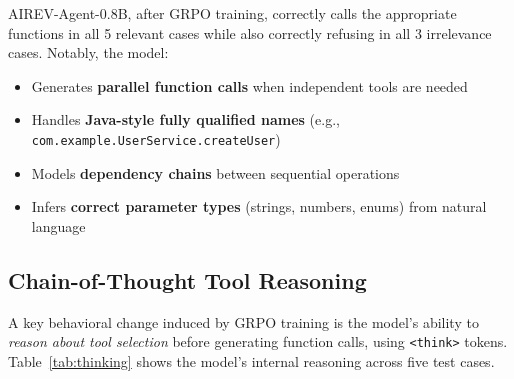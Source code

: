 \documentclass[10pt,twocolumn]{article}
\begin{document}
AIREV-Agent-0.8B, after GRPO training, correctly calls the appropriate functions in all 5 relevant cases while also correctly refusing in all 3 irrelevance cases. Notably, the model:

\begin{itemize}[itemsep=1pt]
    \item Generates \textbf{parallel function calls} when independent tools are needed
    \item Handles \textbf{Java-style fully qualified names} (e.g., \texttt{com.example.UserService.createUser})
    \item Models \textbf{dependency chains} between sequential operations
    \item Infers \textbf{correct parameter types} (strings, numbers, enums) from natural language
\end{itemize}

\subsection{Chain-of-Thought Tool Reasoning}

A key behavioral change induced by GRPO training is the model's ability to \textit{reason about tool selection} before generating function calls, using \texttt{<think>} tokens. Table~\ref{tab:thinking} shows the model's internal reasoning across five test cases.
\end{document}
